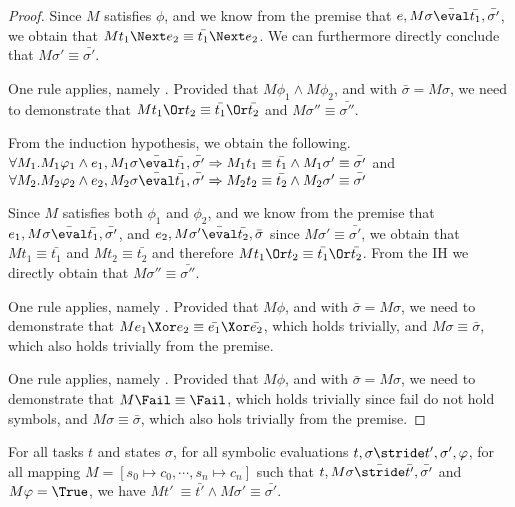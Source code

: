 \begin{proof}
{  Since $M$ satisfies $\phi$,
  and we know from the premise that $e,M\sigma \bar{\eval}\bar{t_1},\bar{\sigma'}$,
  we obtain that $M t_1\Next e_2 \equiv \bar{t_1}\Next e_2$.
  We can furthermore directly conclude that $M \sigma' \equiv\bar{\sigma'}$.

  }

  {One rule applies, namely .
  Provided that $M\phi_1\wedge M\phi_2$, and  with $\bar{\sigma}=M\sigma$,
  we need to demonstrate that $M t_1\Or t_2 \equiv \bar{t_1}\Or\bar{t_2}$ and $M\sigma''\equiv\bar{\sigma''}$.

  From the induction hypothesis, we obtain the following. $\forall M_1 .  M_1\phi_1 \wedge e_1, M_1\sigma \bar{\eval}\bar{t_1},\bar{\sigma'}\implies  M_1 t_1\equiv \bar{t_1} \wedge  M_1\sigma'\equiv\bar{\sigma'}$ and
  $\forall M_2 . M_2\phi_2 \wedge e_2,M_2\sigma \bar{\eval}\bar{t_1},\bar{\sigma'}\implies M_2t_2\equiv \bar{t_2} \wedge M_2\sigma'\equiv\bar{\sigma'}$

  Since $M$ satisfies both $\phi_1$ and $\phi_2$,
  and we know from the premise that $e_1,M\sigma \bar{\eval}\bar{t_1},\bar{\sigma'}$,
  and $e_2,M\sigma'\bar{\eval}\bar{t_2},\bar{\sigma}$ since $M\sigma'\equiv \bar{\sigma'}$,
  we obtain that $M t_1\equiv \bar{t_1}$ and $M t_2 \equiv \bar{t_2}$ and therefore $M t_1\Or t_2 \equiv \bar{t_1}\Or\bar{t_2}$.
  From the IH we directly obtain that $M \sigma'' \equiv\bar{\sigma''}$.

  }

  {  One rule applies, namely .
    Provided that $M\phi$, and  with $\bar{\sigma}=M\sigma$,
    we need to demonstrate that $M e_1\Xor e_2 \equiv \bar{e_1}\Xor\bar{e_2}$,
    which holds trivially,
    and $M\sigma\equiv\bar{\sigma}$, which also holds trivially from the premise.

  }

  {  One rule applies, namely .
    Provided that $M\phi$, and  with $\bar{\sigma}=M\sigma$,
    we need to demonstrate that $M \Fail \equiv \Fail$, which holds trivially since fail do not hold symbols,
    and $M\sigma\equiv\bar{\sigma}$, which also hols trivially from the premise.

  }
\end{proof}

\begin{lemma}
  \label{lem:soundstride}

  For all tasks $t$ and states $\sigma$,
  for all symbolic evaluations $t,\sigma\stride t',\sigma',\phi$,
  for all mapping $M=[s_0\mapsto c_0,\cdots,s_n\mapsto c_n]$
  such that $t,M\sigma \bar{\stride}\bar{t'},\bar{\sigma'}$ and $M \phi= \True$,
  we have $M t'\ \equiv \bar{t'} \land M\sigma' \equiv \bar{\sigma'}$.

\end{lemma}

